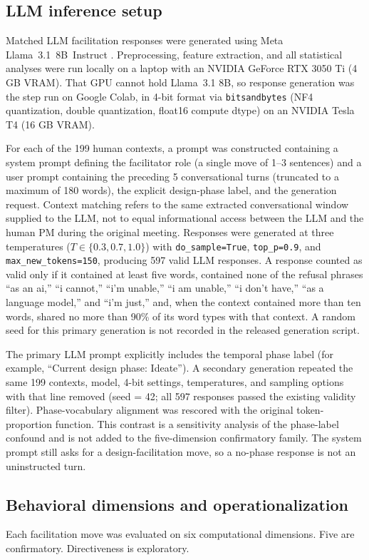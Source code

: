 \documentclass[11pt]{article}
\begin{document}
\subsection{LLM inference setup}
Matched LLM facilitation responses were generated using Meta Llama~3.1~8B~Instruct \citep{dubey2024llama3}. Preprocessing, feature extraction, and all statistical analyses were run locally on a laptop with an NVIDIA GeForce RTX 3050 Ti (4 GB VRAM). That GPU cannot hold Llama~3.1 8B, so response generation was the step run on Google Colab, in 4-bit format via \texttt{bitsandbytes} (NF4 quantization, double quantization, float16 compute dtype) on an NVIDIA Tesla T4 (16 GB VRAM).

For each of the 199 human contexts, a prompt was constructed containing a system prompt defining the facilitator role (a single move of 1--3 sentences) and a user prompt containing the preceding 5 conversational turns (truncated to a maximum of 180 words), the explicit design-phase label, and the generation request. Context matching refers to the same extracted conversational window supplied to the LLM, not to equal informational access between the LLM and the human PM during the original meeting. Responses were generated at three temperatures ($T \in \{0.3, 0.7, 1.0\}$) with \texttt{do\_sample=True}, \texttt{top\_p=0.9}, and \texttt{max\_new\_tokens=150}, producing 597 valid LLM responses. A response counted as valid only if it contained at least five words, contained none of the refusal phrases ``as an ai,'' ``i cannot,'' ``i'm unable,'' ``i am unable,'' ``i don't have,'' ``as a language model,'' and ``i'm just,'' and, when the context contained more than ten words, shared no more than 90\% of its word types with that context. A random seed for this primary generation is not recorded in the released generation script.

The primary LLM prompt explicitly includes the temporal phase label (for example, ``Current design phase: Ideate''). A secondary generation repeated the same 199 contexts, model, 4-bit settings, temperatures, and sampling options with that line removed (seed = 42; all 597 responses passed the existing validity filter). Phase-vocabulary alignment was rescored with the original token-proportion function. This contrast is a sensitivity analysis of the phase-label confound and is not added to the five-dimension confirmatory family. The system prompt still asks for a design-facilitation move, so a no-phase response is not an uninstructed turn.

\subsection{Behavioral dimensions and operationalization}
Each facilitation move was evaluated on six computational dimensions. Five are confirmatory. Directiveness is exploratory.
\end{document}
